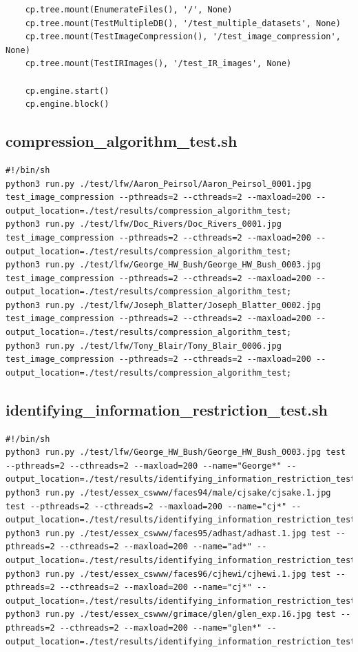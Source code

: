 \documentclass[12pt]{article}
\begin{document}
\begin{appendices}
\begin{lstlisting}
    cp.tree.mount(EnumerateFiles(), '/', None)
    cp.tree.mount(TestMultipleDB(), '/test_multiple_datasets', None)
    cp.tree.mount(TestImageCompression(), '/test_image_compression', None)
    cp.tree.mount(TestIRImages(), '/test_IR_images', None)

    cp.engine.start()
    cp.engine.block()

\end{lstlisting}

\subsection{compression\_algorithm\_test.sh}
\begin{lstlisting}
#!/bin/sh
python3 run.py ./test/lfw/Aaron_Peirsol/Aaron_Peirsol_0001.jpg test_image_compression --pthreads=2 --cthreads=2 --maxload=200 --output_location=./test/results/compression_algorithm_test;
python3 run.py ./test/lfw/Doc_Rivers/Doc_Rivers_0001.jpg test_image_compression --pthreads=2 --cthreads=2 --maxload=200 --output_location=./test/results/compression_algorithm_test;
python3 run.py ./test/lfw/George_HW_Bush/George_HW_Bush_0003.jpg test_image_compression --pthreads=2 --cthreads=2 --maxload=200 --output_location=./test/results/compression_algorithm_test;
python3 run.py ./test/lfw/Joseph_Blatter/Joseph_Blatter_0002.jpg test_image_compression --pthreads=2 --cthreads=2 --maxload=200 --output_location=./test/results/compression_algorithm_test;
python3 run.py ./test/lfw/Tony_Blair/Tony_Blair_0006.jpg test_image_compression --pthreads=2 --cthreads=2 --maxload=200 --output_location=./test/results/compression_algorithm_test;
\end{lstlisting}

\subsection{identifying\_information\_restriction\_test.sh}
\begin{lstlisting}
#!/bin/sh
python3 run.py ./test/lfw/George_HW_Bush/George_HW_Bush_0003.jpg test --pthreads=2 --cthreads=2 --maxload=200 --name="George*" --output_location=./test/results/identifying_information_restriction_test;
python3 run.py ./test/essex_cswww/faces94/male/cjsake/cjsake.1.jpg test --pthreads=2 --cthreads=2 --maxload=200 --name="cj*" --output_location=./test/results/identifying_information_restriction_test;
python3 run.py ./test/essex_cswww/faces95/adhast/adhast.1.jpg test --pthreads=2 --cthreads=2 --maxload=200 --name="ad*" --output_location=./test/results/identifying_information_restriction_test;
python3 run.py ./test/essex_cswww/faces96/cjhewi/cjhewi.1.jpg test --pthreads=2 --cthreads=2 --maxload=200 --name="cj*" --output_location=./test/results/identifying_information_restriction_test;
python3 run.py ./test/essex_cswww/grimace/glen/glen_exp.16.jpg test --pthreads=2 --cthreads=2 --maxload=200 --name="glen*" --output_location=./test/results/identifying_information_restriction_test;
\end{lstlisting}


\end{appendices}
\end{document}
